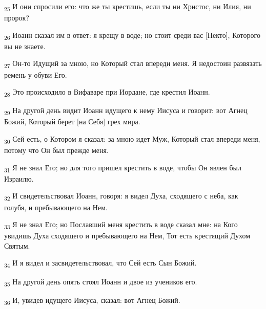 \begin{tcolorbox}
\textsubscript{25} И они спросили его: что же ты крестишь, если ты ни Христос, ни Илия, ни пророк?
\end{tcolorbox}
\begin{tcolorbox}
\textsubscript{26} Иоанн сказал им в ответ: я крещу в воде; но стоит среди вас [Некто], Которого вы не знаете.
\end{tcolorbox}
\begin{tcolorbox}
\textsubscript{27} Он-то Идущий за мною, но Который стал впереди меня. Я недостоин развязать ремень у обуви Его.
\end{tcolorbox}
\begin{tcolorbox}
\textsubscript{28} Это происходило в Вифаваре при Иордане, где крестил Иоанн.
\end{tcolorbox}
\begin{tcolorbox}
\textsubscript{29} На другой день видит Иоанн идущего к нему Иисуса и говорит: вот Агнец Божий, Который берет [на Себя] грех мира.
\end{tcolorbox}
\begin{tcolorbox}
\textsubscript{30} Сей есть, о Котором я сказал: за мною идет Муж, Который стал впереди меня, потому что Он был прежде меня.
\end{tcolorbox}
\begin{tcolorbox}
\textsubscript{31} Я не знал Его; но для того пришел крестить в воде, чтобы Он явлен был Израилю.
\end{tcolorbox}
\begin{tcolorbox}
\textsubscript{32} И свидетельствовал Иоанн, говоря: я видел Духа, сходящего с неба, как голубя, и пребывающего на Нем.
\end{tcolorbox}
\begin{tcolorbox}
\textsubscript{33} Я не знал Его; но Пославший меня крестить в воде сказал мне: на Кого увидишь Духа сходящего и пребывающего на Нем, Тот есть крестящий Духом Святым.
\end{tcolorbox}
\begin{tcolorbox}
\textsubscript{34} И я видел и засвидетельствовал, что Сей есть Сын Божий.
\end{tcolorbox}
\begin{tcolorbox}
\textsubscript{35} На другой день опять стоял Иоанн и двое из учеников его.
\end{tcolorbox}
\begin{tcolorbox}
\textsubscript{36} И, увидев идущего Иисуса, сказал: вот Агнец Божий.
\end{tcolorbox}
